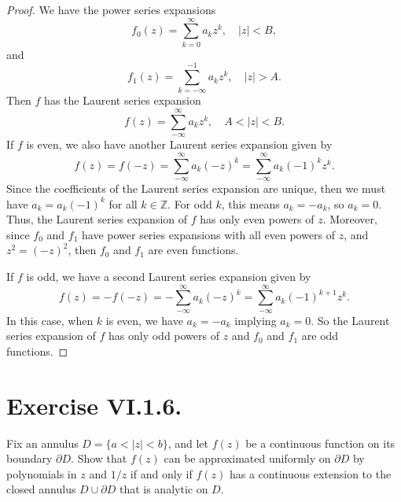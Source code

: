 \documentclass[12pt]{article}
\newenvironment{problem}
    {\begin{lrbox}{\mybox}\begin{minipage}{0.98\textwidth}}
    {\end{minipage}\end{lrbox}\begin{center}\framebox[\textwidth]{\usebox{\mybox}}\end{center}}
\theoremstyle{definition}
\newcommand{\Z}{\mathbb{Z}}
\newcommand{\bd}{\partial}
\begin{document}
\begin{proof}
    We have the power series expansions
    \[
        f_0(z) = \sum_{k=0}^\infty a_k z^k, \quad |z| < B,
    \]
    and
    \[
        f_1(z) = \sum_{k=-\infty}^{-1} a_k z^k, \quad |z| > A.
    \]
    Then $f$ has the Laurent series expansion
    \[
        f(z) = \sum_{-\infty}^\infty a_k z^k, \quad A < |z| < B.
    \]
    If $f$ is even, we also have another Laurent series expansion given by
    \[
        f(z) = f(-z) = \sum_{-\infty}^\infty a_k (-z)^k = \sum_{-\infty}^\infty a_k(-1)^k z^k.
    \]
    Since the coefficients of the Laurent series expansion are unique, then we must have $a_k = a_k(-1)^k$ for all $k \in \Z$. For odd $k$, this means $a_k = -a_k$, so $a_k = 0$. Thus, the Laurent series expansion of $f$ has only even powers of $z$. Moreover, since $f_0$ and $f_1$ have power series expansions with all even powers of $z$, and $z^2 = (-z)^2$, then $f_0$ and $f_1$ are even functions.
    
    If $f$ is odd, we have a second Laurent series expansion given by
    \[
        f(z) = -f(-z) = -\sum_{-\infty}^\infty a_k (-z)^k = \sum_{-\infty}^\infty a_k(-1)^{k+1} z^k.
    \]
    In this case, when $k$ is even, we have $a_k = -a_k$ implying $a_k = 0$. So the Laurent series expansion of $f$ has only odd powers of $z$ and $f_0$ and $f_1$ are odd functions.
    
\end{proof}

\newpage
\section{Exercise VI.1.6.}
\begin{problem}
    Fix an annulus $D = \{a < |z| < b\}$, and let $f(z)$ be a continuous function on its boundary $\bd D$. Show that $f(z)$ can be approximated uniformly on $\bd D$ by polynomials in $z$ and $1/z$ if and only if $f(z)$ has a continuous extension to the closed annulus $D \cup \bd D$ that is analytic on $D$.
\end{problem}
\end{document}
